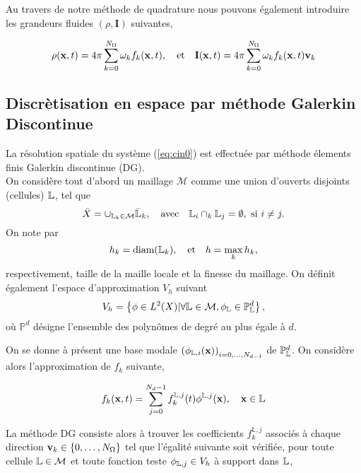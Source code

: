                                                                                                                                                             
Au travers de notre méthode de quadrature nous pouvons également introduire les grandeurs fluides $(\rho,\mathbf{I})$ suivantes,

\begin{equation}
\label{eq:rho}
\rho ( \mathbf{x},t) = 4 \pi \sum_{k=0}^{N_{\Omega}} \omega_k f_k(\mathbf{x},t), \quad \mbox{et} \quad \mathbf{I}(\mathbf{x},t) =  4 \pi \sum_{k=0}^{N_{\Omega}} \omega_k f_k(\mathbf{x},t) \mathbf{v}_k
\end{equation}

\subsection{Discrètisation en espace par méthode Galerkin Discontinue}
La résolution spatiale du système (\ref{eq:cin0}) est effectuée par méthode élements finis Galerkin discontinue (DG).\\
\newline
On considère tout d'abord un maillage $\mathcal{M}$ comme une union d'ouverts disjoints (cellules) $\mathbb{L}$, tel que $$\bar{X} = \cup_{\mathbb{L}_k \in \mathcal{M}} \bar{\mathbb{L}}_k,\quad \mbox{avec} \quad \mathbb{L}_i \cap_k \mathbb{L}_j = \emptyset, \mbox{ si } i \neq j.$$ On note par $$h_k=\mbox{diam}( \mathbb{L}_k), \quad \mbox{et} \quad  h=\max_k h_k,$$ respectivement, taille de la maille locale et la finesse du maillage.
On définit également l'espace d'approximation $V_h$ suivant
\begin{equation}
\label{eq:DGspace}
V_h = \left\{ \phi \in L^2(X) | \forall \mathbb{L} \in \mathcal{M}, \phi_{\mathbb{L}} \in \mathbb{P}^d_{\mathbb{L}} \right\},
\end{equation}
où $\mathbb{P}^d$ désigne l'ensemble des polynômes de degré au plus égale à $d$.
\newline

On se donne à présent une base modale $\left( \phi_{\mathbb{L},i}(\mathbf{x}) \right)_{i=0,\dots,N_{d-1}}$ de $\mathbb{P}^d_{\mathbb{L}}$. On considère alors l'approximation de $f_k$ suivante,

\begin{equation}
\label{eq:DGapprox}
f_k(\mathbf{x},t) = \sum_{j=0}^{N_d-1} f_k^{\mathbb{L},j}(t) \phi^{\mathbb{L},j}(\mathbf{x}), \quad \mathbf{x} \in \mathbb{L}
\end{equation}

La méthode DG consiste alors à trouver les coefficients $f_k^{\mathbb{L},j}$ associés à chaque direction $\mathbf{v}_k \in \left\{0,\dots,N_{\Omega}\right\}$  tel que l'égalité suivante soit vérifiée, pour toute cellule $\mathbb{L} \in \mathcal{M}$ et toute fonction teste $\phi_{\mathbb{L},j} \in V_h$ à support dans $\mathbb{L}$, 

